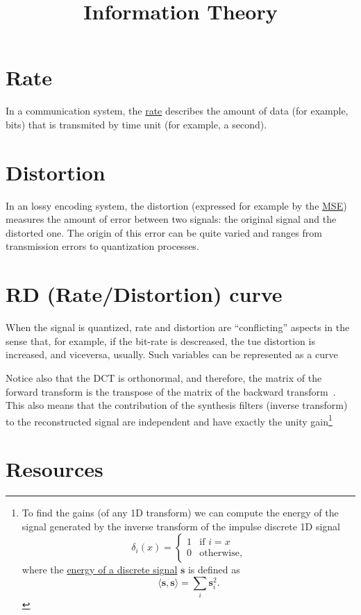 
\title{Information Theory}
\maketitle

\tableofcontents

\section{Rate}

In a communication system, the
\href{https://en.wikipedia.org/wiki/Bit_rate}{rate} describes the
amount of data (for example, bits) that is transmited by time unit
(for example, a second).

\section{Distortion}

In an lossy encoding system, the distortion (expressed for example by
the \href{https://en.wikipedia.org/wiki/Mean_squared_error}{MSE})
measures the amount of error between two signals: the original signal
and the distorted one. The origin of this error can be quite varied
and ranges from transmission errors to quantization processes.

\section{RD (Rate/Distortion) curve}

When the signal is quantized, rate and distortion are ``conflicting''
aspects in the sense that, for example, if the bit-rate is descreased,
the tue distortion is increased, and viceversa, usually. Such variables can be represented as a curve

Notice also that the DCT is orthonormal, and therefore, the matrix of
the forward transform is the transpose of the matrix of the backward
transform~\cite{sayood2017introduction}. This also means that the
contribution of the synthesis filters (inverse transform) to the
reconstructed signal are independent and have exactly the unity
gain\footnote{To find the gains (of any 1D transform) we can compute
the energy of the signal generated by the inverse transform of the
impulse discrete 1D signal
\begin{equation}
  \delta_{i}(x) = 
  \left\{
  \begin{array}{ll}
    1 & \text{if $i=x$}\\
    0 & \text{otherwise},
  \end{array}
  \right.
\end{equation}
where the
\href{https://en.wikipedia.org/wiki/Energy_(signal_processing)}{energy
  of a discrete signal} ${\mathbf s}$ is defined as
\begin{equation}
  \langle {\mathbf s}, {\mathbf s} \rangle =  \sum_{i}{{\mathbf s}_i^2}.
\end{equation}
}

\section{Resources}
\renewcommand{\addcontentsline}[3]{}%

